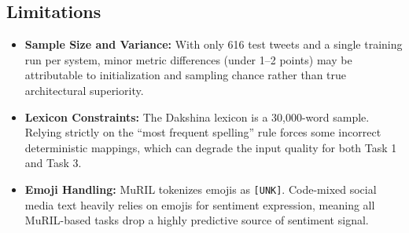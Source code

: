 \subsection*{Limitations}
\begin{itemize}
    \item \textbf{Sample Size and Variance:} With only 616 test tweets and a single training run per system, minor metric differences (under 1--2 points) may be attributable to initialization and sampling chance rather than true architectural superiority.
    \item \textbf{Lexicon Constraints:} The Dakshina lexicon is a 30,000-word sample. Relying strictly on the ``most frequent spelling'' rule forces some incorrect deterministic mappings, which can degrade the input quality for both Task 1 and Task 3.
    \item \textbf{Emoji Handling:} MuRIL tokenizes emojis as \texttt{[UNK]}. Code-mixed social media text heavily relies on emojis for sentiment expression, meaning all MuRIL-based tasks drop a highly predictive source of sentiment signal.
\end{itemize}